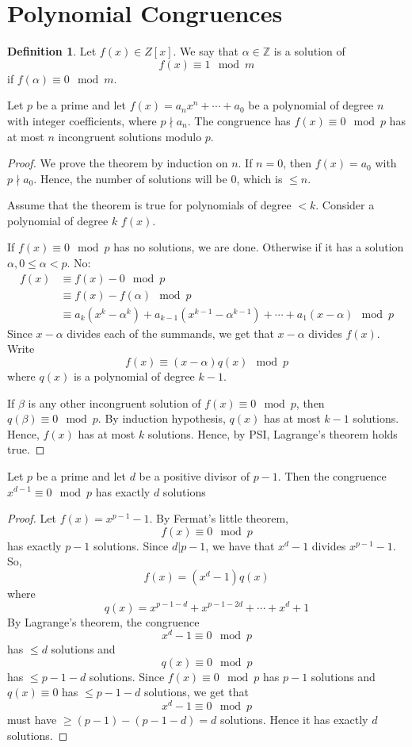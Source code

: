 \documentclass[12pt,letterpaper]{book}
\theoremstyle{definition}
\newtheorem{definition}{Definition} %
\newcommand{\Z}{\mathbb{Z}}
\begin{document}
\section{Polynomial Congruences}

\begin{definition}
  Let $f(x)  \in Z[x]$. We say that $\alpha \in \Z$ is a solution of 
  \[f(x) \equiv 1 \mod m\]
  if $f(\alpha) \equiv 0 \mod m$.
\end{definition}

\begin{theorem}
  Let $p$ be a prime and let $f(x) = a_nx^n + \cdots + a_0$ be a polynomial of degree $n$ with integer coefficients, where $p \nmid a_n$. The congruence has $f(x) \equiv 0 \mod p$ has at most $n$ incongruent solutions modulo $p$.
\end{theorem}
\begin{proof}
  We prove the theorem by induction on $n$. If $n=0$, then $f(x) = a_0$ with $p \nmid a_0$. Hence, the number of solutions will be 0, which is $\leq n$.

  Assume that the theorem is true for polynomials of degree $<k$. Consider a polynomial of degree $k$ $f(x)$.
  
  If $f(x) \equiv 0 \mod p$ has no solutions, we are done. Otherwise if it has a solution $\alpha, 0 \leq \alpha < p$. No:
  \begin{align*}
    f(x) &\equiv f(x) - 0 \mod p \\
         &\equiv f(x) - f(\alpha) \mod p\\
         &\equiv a_k(x^k - \alpha^k)+ a_{k-1} (x^{k-1} - \alpha^{k-1}) + \cdots + a_1(x - \alpha) \mod p
  \end{align*}
  Since $x-\alpha$ divides each of the summands, we get that $x-\alpha$ divides $f(x)$. Write
  \[f(x) \equiv (x-\alpha)q(x) \mod p\]
  where $q(x)$ is a polynomial of degree $k-1$.

  If $\beta$ is any other incongruent solution of $f(x) \equiv 0 \mod p$, then $q(\beta) \equiv 0 \mod p$. By induction hypothesis, $q(x)$ has at most $k-1$ solutions. Hence, $f(x)$ has at most $k$ solutions. Hence, by PSI, Lagrange's theorem holds true.
\end{proof}

\begin{corollary}
  Let $p$ be a prime and let $d$ be a positive divisor of $p-1$. Then the congruence $x^{d-1} \equiv 0 \mod p$ has exactly $d$ solutions
\end{corollary}
\begin{proof}
  Let $f(x) = x^{p-1} -1$. By Fermat's little theorem,
  \[f(x) \equiv 0 \mod p\]
  has exactly $p-1$ solutions. Since $d|p-1$, we have that $x^d-1$ divides $x^{p-1}-1$. So,
  \[f(x) = (x^d-1)q(x)\]
  where
  \[q(x) = x^{p-1-d} + x^{p-1-2d} + \cdots + x^d + 1\]
  By Lagrange's theorem, the congruence
  \[x^d-1 \equiv 0 \mod p\]
  has $\leq d$ solutions and 
  \[q(x) \equiv 0 \mod p\]
  has $\leq p-1-d$ solutions. Since $f(x) \equiv 0 \mod p$ has $p-1$ solutions and $q(x) \equiv 0$ has $\leq p-1-d$ solutions, we get that
  \[x^d-1 \equiv 0 \mod p\]
  must have $\geq (p-1) - (p-1-d) = d$ solutions. Hence it has exactly $d$ solutions.
\end{proof}
\end{document}
